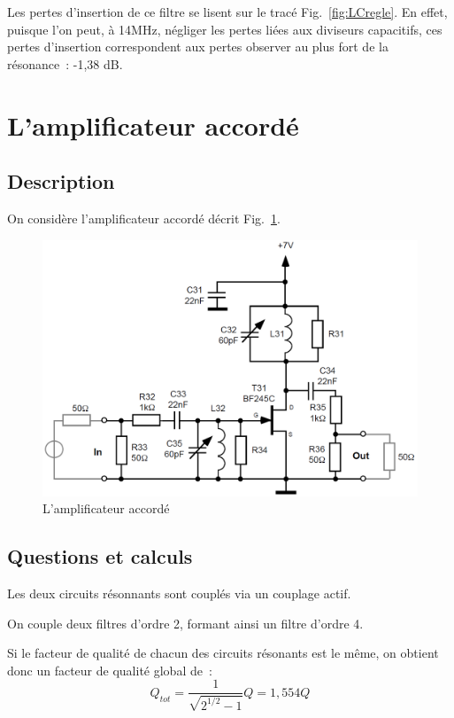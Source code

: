 \documentclass{article}
\begin{document}
Les pertes d'insertion de ce filtre se lisent sur le tracé Fig.~\ref{fig:LCregle}. En effet, puisque l'on peut, à 14MHz, négliger les pertes liées aux diviseurs capacitifs, ces pertes d'insertion correspondent aux pertes observer au plus fort de la résonance~: -1,38 dB.








\section{L'amplificateur accordé}

\subsection{Description}

On considère l'amplificateur accordé décrit Fig.~\ref{schem6}.

\begin{figure}[h!]
	\centering
	\includegraphics[width=.7\textwidth]{schem6}
	\caption{L'amplificateur accordé}
	\label{schem6}
\end{figure}


\subsection{Questions et calculs}


Les deux circuits résonnants sont couplés via un couplage actif.


On couple deux filtres d'ordre 2, formant ainsi un filtre d'ordre 4.

Si le facteur de qualité de chacun des circuits résonants est le même, on obtient donc un facteur de qualité global de~:
\begin{equation*}
Q_{tot} = \frac{1}{\sqrt{2^{1/2}-1}}Q = 1,554 Q
\end{equation*}
\end{document}
